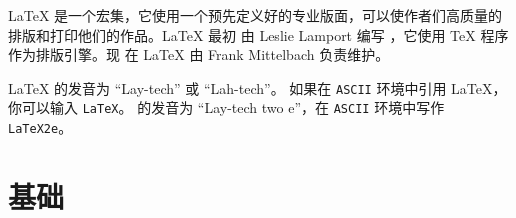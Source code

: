 \LaTeX{} 是一个宏集，它使用一个预先定义好的专业版面，可以使作者们高质量的排版和打印他们的作品。\LaTeX{} 最初
由 Leslie
Lamport 编写 \cite{manual}，它使用 \TeX{} 程序作为排版引擎。现
在 \LaTeX{} 由 Frank Mittelbach 负责维护。



\LaTeX{} 的发音为 ``Lay-tech'' 或 ``Lah-tech''。
如果在 \texttt{ASCII} 环境中引用 \LaTeX{}，你可以输入 \texttt{LaTeX}。
\LaTeXe{} 的发音为 ``Lay-tech two e''，在 \texttt{ASCII} 环境中写作 \texttt{LaTeX2e}。



%

\section{基础}

